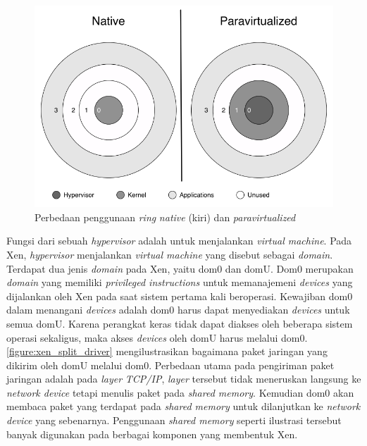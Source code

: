 \begin{figure}[htbp]
    \includegraphics[scale=0.5]{./resources/xen-ring.png}
    \caption{Perbedaan penggunaan \textit{ring} \textit{native} (kiri) dan \textit{paravirtualized} \citep{Chisnall2014}}
    \label{figure:xen_ring}
\end{figure}

Fungsi dari sebuah \textit{hypervisor} adalah untuk menjalankan \textit{virtual machine}.
Pada Xen, \textit{hypervisor} menjalankan \textit{virtual machine} yang disebut sebagai \textit{domain}.
Terdapat dua jenis \textit{domain} pada Xen, yaitu dom0 dan domU.
Dom0 merupakan \textit{domain} yang memiliki \textit{privileged instructions} untuk memanajemeni \textit{devices} yang dijalankan oleh Xen pada saat sistem pertama kali beroperasi.
Kewajiban dom0 dalam menangani \textit{devices} adalah dom0 harus dapat menyediakan \textit{devices} untuk semua domU.
Karena perangkat keras tidak dapat diakses oleh beberapa sistem operasi sekaligus, maka akses \textit{devices} oleh domU harus melalui dom0.
\autoref{figure:xen_split_driver} mengilustrasikan bagaimana paket jaringan yang dikirim oleh domU melalui dom0.
Perbedaan utama pada pengiriman paket jaringan adalah pada \textit{layer} \textit{TCP/IP}, \textit{layer} tersebut tidak meneruskan langsung ke \textit{network device} tetapi menulis paket pada \textit{shared memory}.
Kemudian dom0 akan membaca paket yang terdapat pada \textit{shared memory} untuk dilanjutkan ke \textit{network device} yang sebenarnya.
Penggunaan \textit{shared memory} seperti ilustrasi tersebut banyak digunakan pada berbagai komponen yang membentuk Xen.

